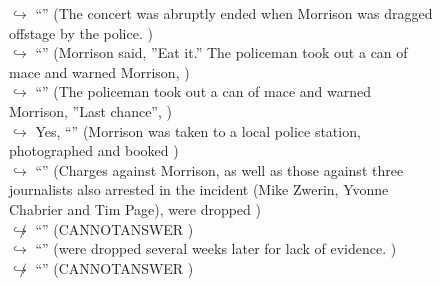 \documentclass[11pt,a4paper, onecolumn]{article}
\begin{document}
\begin{figure}[t] \small \begin{tcolorbox}[boxsep=0pt,left=5pt,right=0pt,top=2pt,colback = yellow!5] \begin{dialogue}
 \small 
\colorbox{pink!25}{$\hookrightarrow$}
{ ``'' (The concert was abruptly ended when Morrison was dragged offstage by the police. ) }
\\
\colorbox{pink!25}{$\hookrightarrow$}
{ ``'' (Morrison said, ''Eat it.'' The policeman took out a can of mace and warned Morrison, ) }
\\
\colorbox{pink!25}{$\hookrightarrow$}
{ ``'' (The policeman took out a can of mace and warned Morrison, ''Last chance'', ) }
\\
\colorbox{pink!25}{$\hookrightarrow$}
\colorbox{red!25}{Yes,}
{ ``'' (Morrison was taken to a local police station, photographed and booked ) }
\\
\colorbox{pink!25}{$\hookrightarrow$}
{ ``'' (Charges against Morrison, as well as those against three journalists also arrested in the incident (Mike Zwerin, Yvonne Chabrier and Tim Page), were dropped ) }
\\
\colorbox{pink!25}{$\not\hookrightarrow$}
{ ``'' (CANNOTANSWER ) }
\\
\colorbox{pink!25}{$\hookrightarrow$}
{ ``'' (were dropped several weeks later for lack of evidence. ) }
\\
\colorbox{pink!25}{$\not\hookrightarrow$}
{ ``'' (CANNOTANSWER ) }
\\
 \end{dialogue}\end{tcolorbox}\end{figure}
\end{document}
